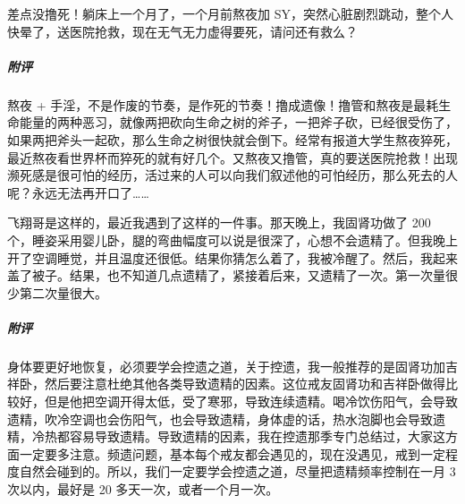 \begin{case}
    差点没撸死！躺床上一个月了，一个月前熬夜加 SY，突然心脏剧烈跳动，整个人快晕了，送医院抢救，现在无气无力虚得要死，请问还有救么？
    \subparagraph{附评} 熬夜 + 手淫，不是作废的节奏，是作死的节奏！撸成遗像！撸管和熬夜是最耗生命能量的两种恶习，就像两把砍向生命之树的斧子，一把斧子砍，已经很受伤了，如果两把斧头一起砍，那么生命之树很快就会倒下。经常有报道大学生熬夜猝死，最近熬夜看世界杯而猝死的就有好几个。又熬夜又撸管，真的要送医院抢救！出现濒死感是很可怕的经历，活过来的人可以向我们叙述他的可怕经历，那么死去的人呢？永远无法再开口了……
\end{case}

\begin{case}
    飞翔哥是这样的，最近我遇到了这样的一件事。那天晚上，我固肾功做了 200 个，睡姿采用婴儿卧，腿的弯曲幅度可以说是很深了，心想不会遗精了。但我晚上开了空调睡觉，并且温度还很低。结果你猜怎么着了，我被冷醒了。然后，我起来盖了被子。结果，也不知道几点遗精了，紧接着后来，又遗精了一次。第一次量很少第二次量很大。
    \subparagraph{附评} 身体要更好地恢复，必须要学会控遗之道，关于控遗，我一般推荐的是固肾功加吉祥卧，然后要注意杜绝其他各类导致遗精的因素。这位戒友固肾功和吉祥卧做得比较好，但是他把空调开得太低，受了寒邪，导致连续遗精。喝冷饮伤阳气，会导致遗精，吹冷空调也会伤阳气，也会导致遗精，身体虚的话，热水泡脚也会导致遗精，冷热都容易导致遗精。导致遗精的因素，我在控遗那季专门总结过，大家这方面一定要多注意。频遗问题，基本每个戒友都会遇见的，现在没遇见，戒到一定程度自然会碰到的。所以，我们一定要学会控遗之道，尽量把遗精频率控制在一月 3 次以内，最好是 20 多天一次，或者一个月一次。
\end{case}

